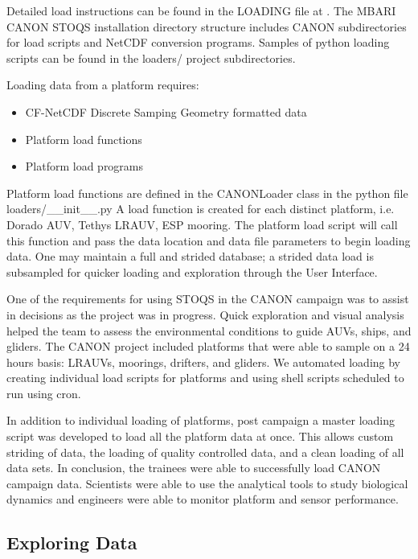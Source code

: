 Detailed load instructions can be found in the LOADING file at \cite{STOQS}. The MBARI CANON STOQS installation directory structure includes CANON subdirectories for load scripts and NetCDF conversion programs. Samples of python loading scripts can be found in the loaders/ project subdirectories. 

Loading data from a platform requires:

\begin{itemize}
\item CF-NetCDF Discrete Samping Geometry formatted data
\item Platform load functions
\item Platform load programs
\end{itemize}

Platform load functions are defined in the CANONLoader class in the python file loaders/\_\_init\_\_.py   A load function is created for each distinct platform, i.e. Dorado AUV, Tethys LRAUV, ESP mooring. The platform load script will call this function and pass the data location and data file parameters to begin loading data.  One may maintain a full and strided database; a strided data load is subsampled for quicker loading and exploration through the User Interface.

One of the requirements for using STOQS in the CANON campaign was to assist in decisions as the project was in progress. Quick exploration and visual analysis helped the team to assess the environmental conditions to guide AUVs, ships, and gliders.  The CANON project included platforms that were able to sample on a 24 hours basis: LRAUVs, moorings, drifters, and gliders. We automated loading by creating individual load scripts for platforms and using shell scripts scheduled to run using cron. 

In addition to individual loading of platforms, post campaign a master loading script was developed to load all the platform data at once.  This allows custom striding of data, the loading of quality controlled data, and a clean loading of all data sets.  In conclusion, the trainees were able to successfully load CANON campaign data.  Scientists were able to use the analytical tools to study biological dynamics and engineers were able to monitor platform and sensor performance.  



\subsection{Exploring Data}

